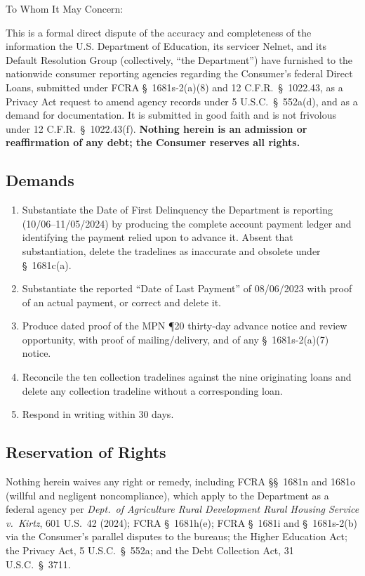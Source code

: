 \documentclass[12pt,letterpaper]{article}
\begin{document}
To Whom It May Concern:

This is a formal direct dispute of the accuracy and completeness of the information the U.S. Department of Education, its servicer Nelnet, and its Default Resolution Group (collectively, ``the Department'') have furnished to the nationwide consumer reporting agencies regarding the Consumer's federal Direct Loans, submitted under FCRA \S~1681s-2(a)(8) and 12 C.F.R.\ \S~1022.43, as a Privacy Act request to amend agency records under 5 U.S.C.\ \S~552a(d), and as a demand for documentation. It is submitted in good faith and is not frivolous under 12 C.F.R.\ \S~1022.43(f). \textbf{Nothing herein is an admission or reaffirmation of any debt; the Consumer reserves all rights.}



\subsection*{Demands}
\begin{enumerate}[label=\arabic*., leftmargin=*]
  \item Substantiate the Date of First Delinquency the Department is reporting (10/06--11/05/2024) by producing the complete account payment ledger and identifying the payment relied upon to advance it. Absent that substantiation, delete the tradelines as inaccurate and obsolete under \S~1681c(a).
  \item Substantiate the reported ``Date of Last Payment'' of 08/06/2023 with proof of an actual payment, or correct and delete it.
  \item Produce dated proof of the MPN ¶20 thirty-day advance notice and review opportunity, with proof of mailing/delivery, and of any \S~1681s-2(a)(7) notice.
  \item Reconcile the ten collection tradelines against the nine originating loans and delete any collection tradeline without a corresponding loan.
  \item Respond in writing within 30 days.
\end{enumerate}

\subsection*{Reservation of Rights}
Nothing herein waives any right or remedy, including FCRA \S\S~1681n and 1681o (willful and negligent noncompliance), which apply to the Department as a federal agency per \emph{Dept.\ of Agriculture Rural Development Rural Housing Service v.\ Kirtz}, 601 U.S.\ 42 (2024); FCRA \S~1681h(e); FCRA \S~1681i and \S~1681s-2(b) via the Consumer's parallel disputes to the bureaus; the Higher Education Act; the Privacy Act, 5 U.S.C.\ \S~552a; and the Debt Collection Act, 31 U.S.C.\ \S~3711.
\end{document}
